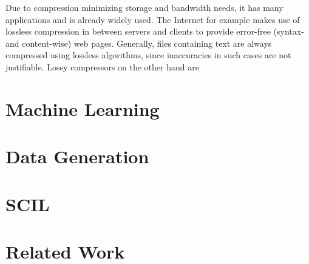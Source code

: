\documentclass[
	12pt,
	a4paper,
	BCOR10mm,
	DIV14,
	headsepline,
]{scrreprt}
\begin{document}


Due to compression minimizing storage and bandwidth needs, it has many applications and is already widely used.
The Internet for example makes use of lossless compression in between servers and clients to provide error-free (syntax- and content-wise) web pages.
Generally, files containing text are always compressed using lossless algorithms, since inaccuracies in such cases are not justifiable.
Lossy compressors on the other hand are

\section{Machine Learning}
\label{s:ml}

\section{Data Generation}
\label{s:dg}

\section{SCIL}
\label{s:scil}

\section{Related Work} %
\label{s:rw}
\end{document}
